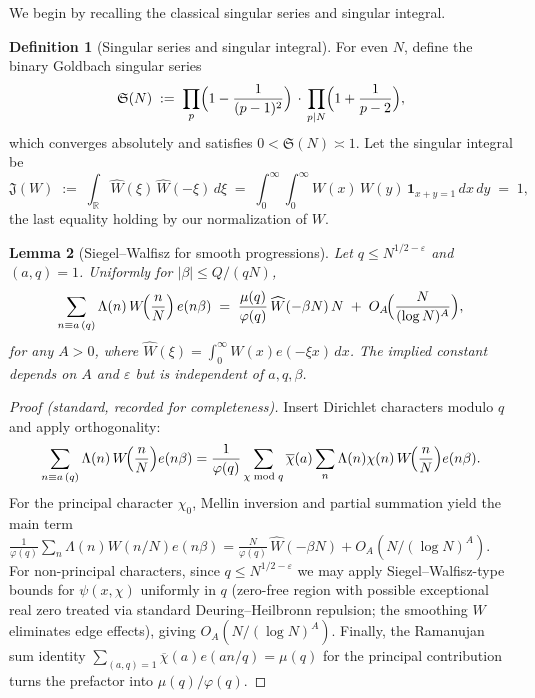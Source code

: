 \documentclass[11pt]{article}
\newtheorem{lemma}{Lemma}[part]
\theoremstyle{definition}
\newtheorem{definition}[lemma]{Definition}
\theoremstyle{remark}
\numberwithin{equation}{part}
\begin{document}
We begin by recalling the classical singular series and singular integral.

\begin{definition}[Singular series and singular integral]
	For even $N$, define the binary Goldbach singular series
	\[
		\mathfrak S(N)\;:=\;\prod_{p}\Bigl(1-\frac{1}{(p-1)^2}\Bigr)\,\cdot\,
		\prod_{p\mid N}\Bigl(1+\frac{1}{p-2}\Bigr),
	\]
	which converges absolutely and satisfies $0<\mathfrak S(N)\asymp 1$.
	Let the singular integral be
	\[
		\mathfrak J(W)\;:=\;\int_{\mathbb R} \widehat W(\xi)\,\widehat W(-\xi)\,d\xi
		\;=\;\int_0^\infty\!\!\int_0^\infty W(x)\,W(y)\,\mathbf 1_{x+y=1}\,dx\,dy
		\;=\;1,
	\]
	the last equality holding by our normalization of $W$.
\end{definition}

\begin{lemma}[Siegel--Walfisz for smooth progressions]\label{lem:SW-smooth}
	Let $q\le N^{1/2-\varepsilon}$ and $(a,q)=1$.
	Uniformly for $|\beta|\le Q/(qN)$,
	\[
		\sum_{n\equiv a\,(q)} \Lambda(n)\,W\!\Bigl(\frac{n}{N}\Bigr)\,e(n\beta)
		\;=\; \frac{\mu(q)}{\varphi(q)}\,\widehat W(-\beta N)\,N
		\;+\; O_A\!\Bigl(\frac{N}{(\log N)^{A}}\Bigr),
	\]
	for any $A>0$, where $\widehat W(\xi)=\int_0^\infty W(x)e(-\xi x)\,dx$.
	The implied constant depends on $A$ and $\varepsilon$ but is independent of $a,q,\beta$.
\end{lemma}

\begin{proof}[Proof (standard, recorded for completeness)]
	Insert Dirichlet characters modulo $q$ and apply orthogonality:
	\[
		\sum_{n\equiv a\,(q)} \Lambda(n)\,W\!\Bigl(\frac{n}{N}\Bigr) e(n\beta)
		= \frac{1}{\varphi(q)}\sum_{\chi\bmod q}\overline{\chi}(a)\sum_{n}\Lambda(n)\chi(n)\,W\!\Bigl(\frac{n}{N}\Bigr) e(n\beta).
	\]
	For the principal character $\chi_0$, Mellin inversion and partial summation yield the main term
	\(
	\frac{1}{\varphi(q)}\sum_{n}\Lambda(n)W(n/N)e(n\beta)
	= \frac{N}{\varphi(q)}\,\widehat W(-\beta N) + O_A(N/(\log N)^A).
	\)
	For non-principal characters, since $q\le N^{1/2-\varepsilon}$ we may apply Siegel--Walfisz-type bounds for $\psi(x,\chi)$ uniformly in $q$ (zero-free region with possible exceptional real zero treated via standard Deuring--Heilbronn repulsion; the smoothing $W$ eliminates edge effects), giving $O_A(N/(\log N)^A)$.
	Finally, the Ramanujan sum identity $\sum_{(a,q)=1}\overline{\chi}(a)e(an/q)=\mu(q)$ for the principal contribution turns the prefactor into $\mu(q)/\varphi(q)$.
\end{proof}
\end{document}
